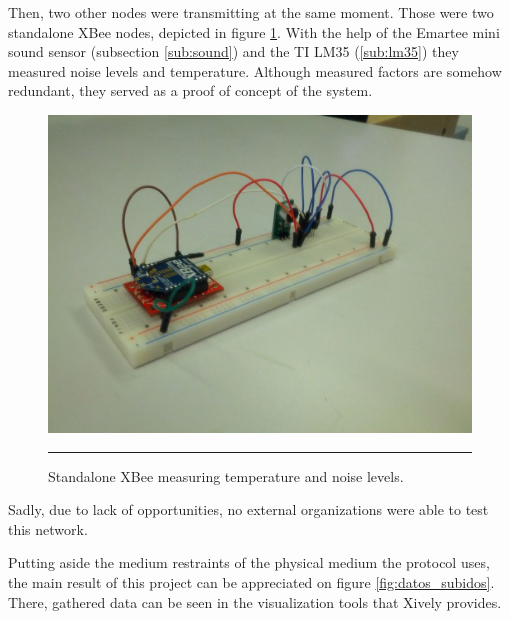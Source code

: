 Then, two other nodes were transmitting at the same moment. Those were two standalone XBee\textregistered{} nodes, depicted in figure \ref{fig:noxo}. With the help of the Emartee mini sound sensor (subsection \ref{sub:sound}) and the TI LM35 (\ref{sub:lm35}) they measured noise levels and temperature. Although measured factors are somehow redundant, they served as a proof of concept of the system.

\begin{figure}[htbp]
    \centering
        \includegraphics[scale=0.4]{./Figures/noxo.jpg}
        \rule{35em}{0.5pt}
    \caption[An actual standalone XBee\textregistered{} node]{Standalone XBee\textregistered{} measuring temperature and noise levels.}
    \label{fig:noxo}
\end{figure}

Sadly, due to lack of opportunities, no external organizations were able to test this network.


Putting aside the medium restraints of the physical medium the protocol uses, the main result of this project can be appreciated on figure \ref{fig:datos_subidos}. There, gathered data can be seen in the visualization tools that Xively provides.

